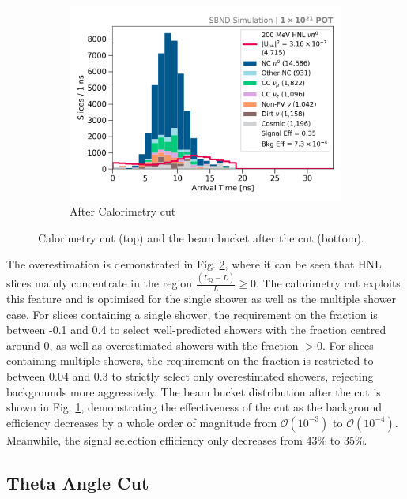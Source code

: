 \begin{figure}[bp!]
\begin{subfigure}[b]{0.495\textwidth}
            \includegraphics[width=\textwidth]{beam_bucket_postopt0}
            \caption{After Calorimetry cut}%
	    \label{fig:bb_opt0}
        \end{subfigure}
	\caption[Calorimetry Cut]{
		Calorimetry cut (top) and the beam bucket after the cut (bottom). 
	}
        \label{fig:opt0_cut}
\end{figure}

The overestimation is demonstrated in Fig. \ref{fig:opt0_cut}, where it can be seen that HNL slices mainly concentrate in the region $\frac{(L_{\mathrm{Q}} - L)}{L} \geq 0$. 
The calorimetry cut exploits this feature and is optimised for the single shower as well as the multiple shower case.
For slices containing a single shower, the requirement on the fraction is between -0.1 and 0.4 to select well-predicted showers with the fraction centred around 0, as well as overestimated showers with the fraction $> 0$. 
For slices containing multiple showers, the requirement on the fraction is restricted to between 0.04 and 0.3 to strictly select only overestimated showers, rejecting backgrounds more aggressively.
The beam bucket distribution after the cut is shown in Fig. \ref{fig:bb_opt0}, demonstrating the effectiveness of the cut as the background efficiency decreases by a whole order of magnitude from $\mathcal{O}(10^{-3})$ to $\mathcal{O}(10^{-4})$. 
Meanwhile, the signal selection efficiency only decreases from 43\% to 35\%.

\subsection{Theta Angle Cut}
\label{sec:theta_cut}


